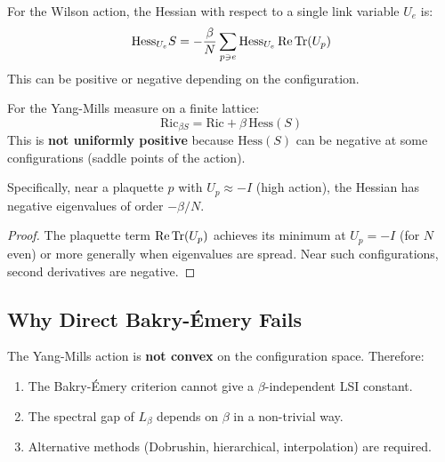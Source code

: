 \begin{proposition}\label{prop:hessian-wilson}
For the Wilson action, the Hessian with respect to a single link variable $U_e$ is:
\begin{equation}
    \mathrm{Hess}_{U_e} S = -\frac{\beta}{N} \sum_{p \ni e} \mathrm{Hess}_{U_e} \operatorname{Re} \operatorname{Tr}(U_p)
\end{equation}
This can be positive or negative depending on the configuration.
\end{proposition}

\begin{theorem}\label{thm:be-ym}
For the Yang-Mills measure on a finite lattice:
\begin{equation}
    \mathrm{Ric}_{\beta S} = \mathrm{Ric} + \beta \, \mathrm{Hess}(S)
\end{equation}
This is \textbf{not uniformly positive} because $\mathrm{Hess}(S)$ can be negative at some configurations (saddle points of the action).

Specifically, near a plaquette $p$ with $U_p \approx -I$ (high action), the Hessian has negative eigenvalues of order $-\beta/N$.
\end{theorem}

\begin{proof}
The plaquette term $\operatorname{Re} \operatorname{Tr}(U_p)$ achieves its minimum at $U_p = -I$ (for $N$ even) or more generally when eigenvalues are spread. Near such configurations, second derivatives are negative.
\end{proof}

\subsection{Why Direct Bakry-\'Emery Fails}

\begin{corollary}
The Yang-Mills action is \textbf{not convex} on the configuration space. Therefore:
\begin{enumerate}
    \item The Bakry-\'Emery criterion cannot give a $\beta$-independent LSI constant.
    \item The spectral gap of $L_\beta$ depends on $\beta$ in a non-trivial way.
    \item Alternative methods (Dobrushin, hierarchical, interpolation) are required.
\end{enumerate}
\end{corollary}

